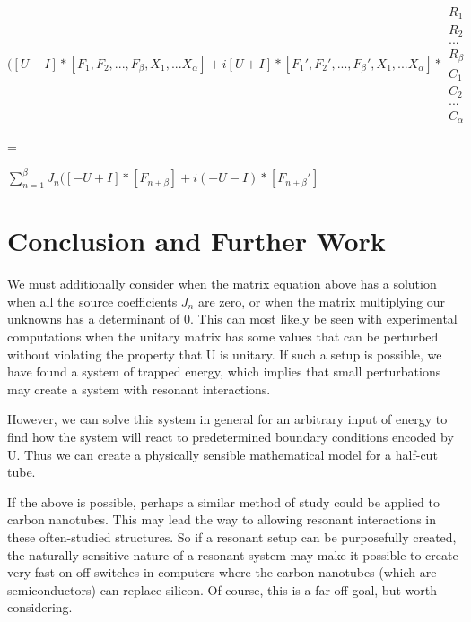 \documentclass[12pt]{article}
\begin{document}
$([U-I] * [F_1, F_2, ...,F_\beta, X_1, 	... X_\alpha]  + i[U+I]* [F_1', F_2', ...,F_\beta', X_1, 	... X_\alpha]* 
\begin{array}{c}
      R_1 \\ R_2 \\ ... \\ R_\beta \\ C_1 \\ C_2 \\ ... \\ C_\alpha
  \end{array}$



 = 
\newline

$\sum_{n=1}^{\beta} J_n([-U+I] * [F_{n+\beta}] + i(-U-I)*[F_{n+\beta}']$


\section{Conclusion and Further Work}

We must additionally consider when the matrix equation above has a solution when all the source coefficients $J_n$ are zero, or when the matrix multiplying our unknowns has a determinant of 0. This can most likely be seen with experimental computations when the unitary matrix has some values that can be perturbed without violating the property that U is unitary. If such a setup is possible, we have found a system of trapped energy, which implies that small perturbations may create a system with resonant interactions. 


However, we can solve this system in general for an arbitrary input of energy to find how the system will react to predetermined boundary conditions encoded by U. Thus we can create a physically sensible mathematical model for a half-cut tube.

If the above is possible, perhaps a similar method of study could be applied to carbon nanotubes. This may lead the way to allowing resonant interactions in these often-studied structures. So if a resonant setup can be purposefully created, the naturally sensitive nature of a resonant system may make it possible to create very fast on-off switches in computers where the carbon nanotubes (which are semiconductors) can replace silicon. Of course, this is a far-off goal, but worth considering. 

\bigskip





\end{document}
